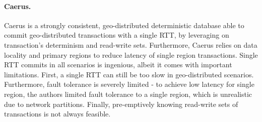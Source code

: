 %



\paragraph{Caerus.} Caerus is a strongly consistent, geo-distributed deterministic database able to commit geo-distributed transactions with a single RTT, by leveraging on transaction's determinism and read-write sets.%
Furthermore, Caerus relies on data locality and primary regions to reduce latency of single region transactions.
Single RTT commits in all scenarios is ingenious, albeit it comes with important limitations. 
First, a single RTT can still be too slow in geo-distributed scenarios.
Furthermore, fault tolerance is severely limited - to achieve low latency for single region, the authors limited fault tolerance to a single region, which is unrealistic due to network partitions.
Finally, pre-emptively knowing read-write sets of transactions is not always feasible.

